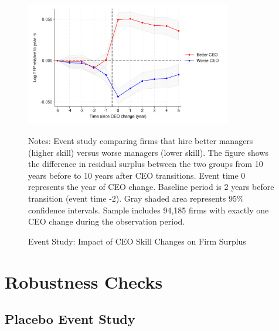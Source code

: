 \documentclass[11pt,a4paper]{article}
\begin{document}
\begin{figure}[htbp]
\centering
\includegraphics[width=0.8\textwidth]{figure/event_study.pdf}
\caption{Event Study: Impact of CEO Skill Changes on Firm Surplus}
\label{fig:event_study}
\footnotesize
Notes: Event study comparing firms that hire better managers (higher skill) versus worse managers (lower skill). The figure shows the difference in residual surplus between the two groups from 10 years before to 10 years after CEO transitions. Event time 0 represents the year of CEO change. Baseline period is 2 years before transition (event time -2). Gray shaded area represents 95\% confidence intervals. Sample includes 94,185 firms with exactly one CEO change during the observation period.
\end{figure}






\appendix
\section{Robustness Checks}

\subsection{Placebo Event Study}
\end{document}
